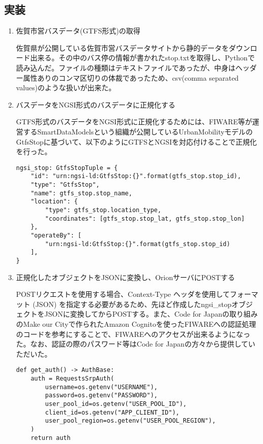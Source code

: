 \documentclass[a4paper, 12pt]{jsreport}
\begin{document}
  \subsection{実装}
  \begin{enumerate}
    \item 佐賀市営バスデータ(GTFS形式)の取得 \par 佐賀県が公開している佐賀市営バスデータサイト\cite{sagaBusSite}から静的データをダウンロード出来る。その中のバス停の情報が書かれたstop.txtを取得し、Pythonで読み込んだ。ファイルの種類はテキストファイルであったが、中身はヘッダー属性ありのコンマ区切りの体裁であったため、csv(comma
      separated values)のような扱いが出来た。

    \item バスデータをNGSI形式のバスデータに正規化する \par GTFS形式のバスデータをNGSI形式に正規化するためには、FIWARE等が運営するSmartDataModels\cite{smartDataModel}という組織が公開しているUrbanMobilityモデルのGtfsStop\cite{GtfsStop}に基づいて、以下のようにGTFSとNGSIを対応付けることで正規化を行った。
      \begin{screen}
        \begin{verbatim}
ngsi_stop: GtfsStopTuple = {
    "id": "urn:ngsi-ld:GtfsStop:{}".format(gtfs_stop.stop_id),
    "type": "GtfsStop",
    "name": gtfs_stop.stop_name,
    "location": {
        "type": gtfs_stop.location_type,
        "coordinates": [gtfs_stop.stop_lat, gtfs_stop.stop_lon]
    },
    "operateBy": [
        "urn:ngsi-ld:GtfsStop:{}".format(gtfs_stop.stop_id)
    ],
}
      \end{verbatim}
      \end{screen}

    \item 正規化したオブジェクトをJSONに変換し、OrionサーバにPOSTする \par POSTリクエストを使用する場合、Context-Type
      ヘッダを使用してフォーマット (JSON) を指定する必要があるため、先ほど作成したngsi\_stopオブジェクトをJSONに変換してからPOSTする。また、Code
      for Japanの取り組みのMake our Cityで作られたAmazon Cognitoを使ったFIWAREへの認証処理のコード\cite{makeOurAuth}を参考にすることで、FIWAREへのアクセスが出来るようになった。なお、認証の際のパスワード等はCode
      for Japanの方々から提供していただいた。
      \begin{screen}
        \begin{verbatim}
def get_auth() -> AuthBase:
    auth = RequestsSrpAuth(
        username=os.getenv("USERNAME"),
        password=os.getenv("PASSWORD"),
        user_pool_id=os.getenv("USER_POOL_ID"),
        client_id=os.getenv("APP_CLIENT_ID"),
        user_pool_region=os.getenv("USER_POOL_REGION"),
    )
    return auth


\end{verbatim}
\end{screen}
\end{enumerate}
\end{document}
